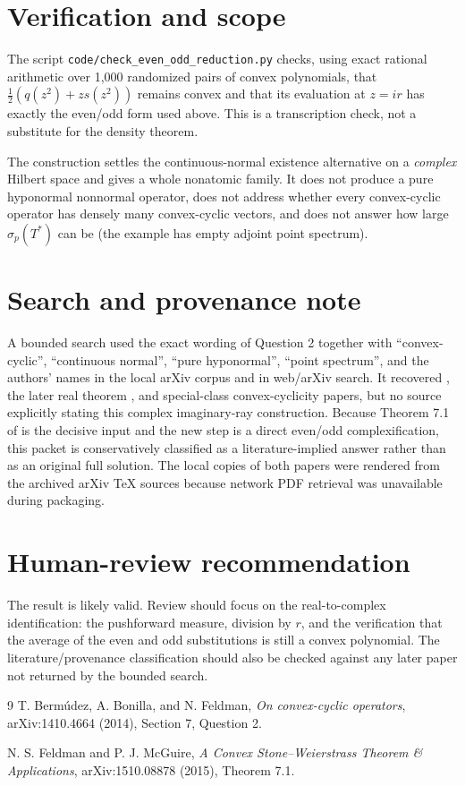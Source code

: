 \documentclass[11pt]{article}
\begin{document}
\section{Verification and scope}

The script \texttt{code/check\_even\_odd\_reduction.py} checks, using exact
rational arithmetic over 1,000 randomized pairs of convex polynomials, that
$\tfrac12(q(z^2)+zs(z^2))$ remains convex and that its evaluation at $z=ir$
has exactly the even/odd form used above.  This is a transcription check, not
a substitute for the density theorem.

The construction settles the continuous-normal existence alternative on a
\emph{complex} Hilbert space and gives a whole nonatomic family.  It does not
produce a pure hyponormal nonnormal operator, does not address whether every
convex-cyclic operator has densely many convex-cyclic vectors, and does not
answer how large $\sigma_p(T^*)$ can be (the example has empty adjoint point
spectrum).

\section{Search and provenance note}

A bounded search used the exact wording of Question 2 together with
``convex-cyclic'', ``continuous normal'', ``pure hyponormal'', ``point
spectrum'', and the authors' names in the local arXiv corpus and in web/arXiv
search.  It recovered \cite{BBF}, the later real theorem \cite{FM}, and
special-class convex-cyclicity papers, but no source explicitly stating this
complex imaginary-ray construction.  Because Theorem 7.1 of \cite{FM} is the
decisive input and the new step is a direct even/odd complexification, this
packet is conservatively classified as a literature-implied answer rather
than as an original full solution.  The local copies of both papers were
rendered from the archived arXiv TeX sources because network PDF retrieval was
unavailable during packaging.

\section{Human-review recommendation}

The result is likely valid.  Review should focus on the real-to-complex
identification: the pushforward measure, division by $r$, and the verification
that the average of the even and odd substitutions is still a convex
polynomial.  The literature/provenance classification should also be checked
against any later paper not returned by the bounded search.

\begin{thebibliography}{9}
T. Berm\'udez, A. Bonilla, and N. Feldman,
\emph{On convex-cyclic operators}, arXiv:1410.4664 (2014), Section 7,
Question 2.

N. S. Feldman and P. J. McGuire,
\emph{A Convex Stone--Weierstrass Theorem \& Applications},
arXiv:1510.08878 (2015), Theorem 7.1.
\end{thebibliography}
\end{document}
